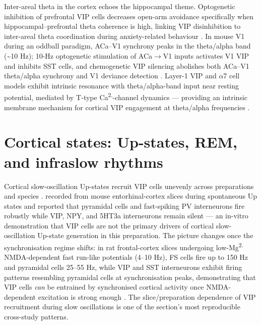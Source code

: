\documentclass[11pt]{article}
\let\origrightarrow\rightarrow
\def\rightarrow{\ensuremath{\origrightarrow}}
\begin{document}
Inter-areal theta in the cortex echoes the hippocampal theme. Optogenetic inhibition of prefrontal VIP cells decreases open-arm avoidance specifically when hippocampal--prefrontal theta coherence is high, linking VIP disinhibition to inter-areal theta coordination during anxiety-related behaviour \citep{Lee2019}. In mouse V1 during an oddball paradigm, ACa--V1 synchrony peaks in the theta/alpha band ({\textasciitilde}10 Hz); 10-Hz optogenetic stimulation of ACa\rightarrow V1 inputs activates V1 VIP and inhibits SST cells, and chemogenetic VIP silencing abolishes both ACa--V1 theta/alpha synchrony and V1 deviance detection \citep{Bastos2023a}. Layer-1 VIP and $\alpha$7 cell models exhibit intrinsic resonance with theta/alpha-band input near resting potential, mediated by T-type Ca\textsuperscript{2}\textsuperscript{.}-channel dynamics --- providing an intrinsic membrane mechanism for cortical VIP engagement at theta/alpha frequencies \citep{Meng2023}.

\section{Cortical states: Up-states, REM, and infraslow rhythms}

Cortical slow-oscillation Up-states recruit VIP cells unevenly across preparations and species \citep{Tahvildari2012, Kawaguchi2001, Brecier2022, Sabri2024}. \citet{Tahvildari2012} recorded from mouse entorhinal-cortex slices during spontaneous Up states and reported that pyramidal cells and fast-spiking PV interneurons fire robustly while VIP, NPY, and 5HT3a interneurons remain silent --- an in-vitro demonstration that VIP cells are not the primary drivers of cortical slow-oscillation Up-state generation in this preparation. The picture changes once the synchronisation regime shifts: in rat frontal-cortex slices undergoing low-Mg\textsuperscript{2}\textsuperscript{.} NMDA-dependent fast run-like potentials (4--10 Hz), FS cells fire up to 150 Hz and pyramidal cells 25--55 Hz, while VIP and SST interneurons exhibit firing patterns resembling pyramidal cells at synchronisation peaks, demonstrating that VIP cells \textit{can} be entrained by synchronised cortical activity once NMDA-dependent excitation is strong enough \citep{Kawaguchi2001}. The slice/preparation dependence of VIP recruitment during slow oscillations is one of the section's most reproducible cross-study patterns.
\end{document}
